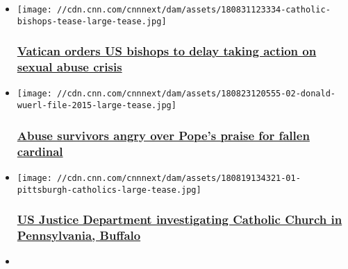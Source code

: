 \begin{itemize}
\item
  \href{/2018/11/12/us/conference-of-catholic-bishops-vatican/index.html}{}

  \texttt{[image: //cdn.cnn.com/cnnnext/dam/assets/180831123334-catholic-bishops-tease-large-tease.jpg]}

  \hypertarget{vatican-orders-us-bishops-to-delay-taking-action-on-sexual-abuse-crisis-}{%
  \subsubsection{\texorpdfstring{\href{/2018/11/12/us/conference-of-catholic-bishops-vatican/index.html}{Vatican
  orders US bishops to delay taking action on sexual abuse crisis
  }}{Vatican orders US bishops to delay taking action on sexual abuse crisis }}\label{vatican-orders-us-bishops-to-delay-taking-action-on-sexual-abuse-crisis-}}
\item
  \href{/2018/10/12/us/cardinal-wuerl-resignation/index.html}{}

  \texttt{[image: //cdn.cnn.com/cnnnext/dam/assets/180823120555-02-donald-wuerl-file-2015-large-tease.jpg]}

  \hypertarget{abuse-survivors-angry-over-popes-praise-for-fallen-cardinal}{%
  \subsubsection{\texorpdfstring{\href{/2018/10/12/us/cardinal-wuerl-resignation/index.html}{Abuse
  survivors angry over Pope's praise for fallen
  cardinal}}{Abuse survivors angry over Pope's praise for fallen cardinal}}\label{abuse-survivors-angry-over-popes-praise-for-fallen-cardinal}}
\item
  \href{/2018/10/18/us/catholic-church-us-investigation/index.html}{}

  \texttt{[image: //cdn.cnn.com/cnnnext/dam/assets/180819134321-01-pittsburgh-catholics-large-tease.jpg]}

  \hypertarget{us-justice-department-investigating-catholic-church-in-pennsylvania-buffalo-}{%
  \subsubsection{\texorpdfstring{\href{/2018/10/18/us/catholic-church-us-investigation/index.html}{US
  Justice Department investigating Catholic Church in Pennsylvania,
  Buffalo
  }}{US Justice Department investigating Catholic Church in Pennsylvania, Buffalo }}\label{us-justice-department-investigating-catholic-church-in-pennsylvania-buffalo-}}
\item
  \href{/2018/09/23/europe/silent-popes/index.html}{}


\end{itemize}
